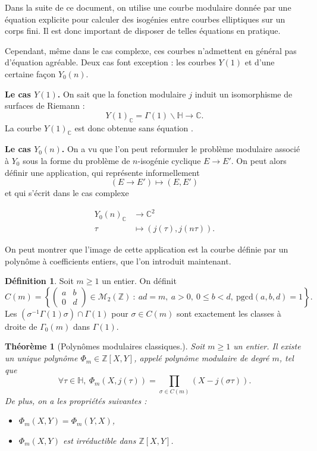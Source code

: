 \documentclass[11pt,a4paper]{article}
\newcommand{\Z}{\mathbb{Z}}
\newcommand{\C}{\mathbb{C}}
\renewcommand{\H}{\mathbb{H}}
\newcommand{\M}{\mathcal{M}}
\renewcommand{\b}{\backslash}
\newcommand{\vers}{\longrightarrow}
\newtheorem*{thm}{Théorème}
\theoremstyle{definition}
\newtheorem*{defi}{Définition}
\begin{document}
Dans la suite de ce document, on utilise une courbe modulaire donnée par une équation explicite pour calculer des isogénies entre courbes elliptiques sur un corps fini. Il est donc important de disposer de telles équations en pratique.

Cependant, même dans le cas complexe, ces courbes n'admettent en général pas d'équation agréable. Deux cas font exception : les courbes $Y(1)$ et d'une certaine façon $Y_0(n)$.

\textbf{Le cas $Y(1)$.} On sait que la fonction modulaire $j$ induit un isomorphisme de surfaces de Riemann :
$$Y(1)_\C = \Gamma(1)\b \H \vers \C.$$
La courbe $Y(1)_\C$ est donc obtenue \og sans équation \fg.

\textbf{Le cas $Y_0(n)$.} On a vu que l'on peut reformuler le problème modulaire associé à $Y_0$ sous la forme du problème de $n$-isogénie cyclique $E\vers E'$. On peut alors définir une application, qui représente informellement
$$(E\vers E') \longmapsto (E, E')$$
et qui s'écrit dans le cas complexe

$$\begin{aligned}
Y_0(n)_\C &\vers \C^2 \\
 \tau &\longmapsto (j(\tau), j(n\tau)).
\end{aligned}$$

On peut montrer que l'image de cette application est la courbe définie par un polynôme à coefficients entiers, que l'on introduit maintenant.

\begin{defi}
Soit $m\geq 1$ un entier. On définit
$$C(m)=\left\{ 
\left(
\begin{matrix}
a & b \\
0 & d 
\end{matrix}
\right)
\in \M_2(\Z)\ :\ ad=m,\ a>0,\ 0\leq b<d,\ \mathrm{pgcd}(a,b,d)=1\right\}.$$
Les $(\sigma^{-1}\Gamma(1)\sigma)\cap \Gamma(1)$ pour $\sigma\in C(m)$ sont exactement les classes à droite de $\Gamma_0(m)$ dans $\Gamma(1)$.
\end{defi}


\begin{thm}[Polynômes modulaires classiques.]

Soit $m\geq 1$ un entier. Il existe un unique  polynôme $\Phi_m \in \Z[X,Y]$, appelé \emph{polynôme modulaire} de degré $m$, tel que
$$\forall \tau\in\H,\ \Phi_m(X,j(\tau))=\prod_{\sigma\in C(m)} (X-j(\sigma\tau)).$$
De plus, on a les propriétés suivantes :

\begin{itemize}
\item[(i)] $\Phi_m(X,Y)=\Phi_m(Y,X)$,
\item[(ii)] $\Phi_m(X,Y)$ est irréductible dans $\Z[X,Y]$.
\end{itemize}

\end{thm}
\end{document}
